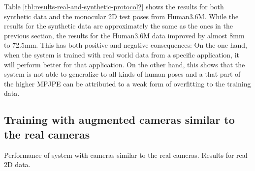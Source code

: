 

Table \ref{tbl:results-real-and-synthetic-protocol2} shows the results for both synthetic data and the monocular 2D test poses from Human3.6M.
While the results for the synthetic data are approximately the same as the ones in the previous section, the results for the Human3.6M data improved by almost 8mm to 72.5mm.
This has both positive and negative consequences:
On the one hand, when the system is trained with real world data from a specific application, it will perform better for that application.
On the other hand, this shows that the system is not able to generalize to all kinds of human poses and a that part of the higher MPJPE can be attributed to a weak form of overfitting to the training data. 

\subsection{Training with augmented cameras similar to the real cameras}
Performance of system with cameras similar to the real cameras.
Results for real 2D data.